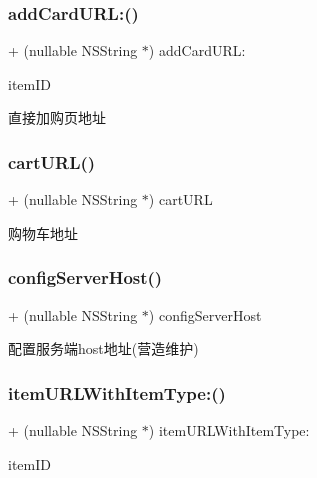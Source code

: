 \subsubsection{\texorpdfstring{add\+Card\+U\+R\+L\+:()}{addCardURL:()}}
{\footnotesize\ttfamily + (nullable N\+S\+String $\ast$) add\+Card\+U\+R\+L\+: \begin{DoxyParamCaption}\item[{(N\+S\+String $\ast$)}]{item\+ID }\end{DoxyParamCaption}}

直接加购页地址 \mbox{\label{interface_alibc_trade_env_abcabe04de764fb86be28bb5eec720489}} 
\subsubsection{\texorpdfstring{cart\+U\+R\+L()}{cartURL()}}
{\footnotesize\ttfamily + (nullable N\+S\+String $\ast$) cart\+U\+RL \begin{DoxyParamCaption}{ }\end{DoxyParamCaption}}

购物车地址 \mbox{\label{interface_alibc_trade_env_ac1378bad7925be77052f5d5322470f78}} 
\subsubsection{\texorpdfstring{config\+Server\+Host()}{configServerHost()}}
{\footnotesize\ttfamily + (nullable N\+S\+String $\ast$) config\+Server\+Host \begin{DoxyParamCaption}{ }\end{DoxyParamCaption}}

配置服务端host地址(营造维护) \mbox{\label{interface_alibc_trade_env_a1843b20070b3f79a1d105a6ce78099b2}} 
\subsubsection{\texorpdfstring{item\+U\+R\+L\+With\+Item\+Type\+:()}{itemURLWithItemType:()}}
{\footnotesize\ttfamily + (nullable N\+S\+String $\ast$) item\+U\+R\+L\+With\+Item\+Type\+: \begin{DoxyParamCaption}\item[{(N\+S\+String $\ast$)}]{item\+ID }\end{DoxyParamCaption}}

